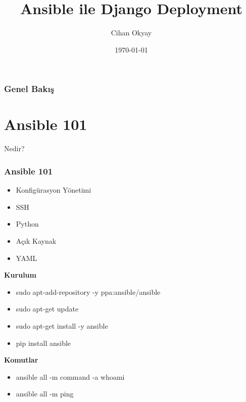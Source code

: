 \documentclass{beamer}
\title[Ansible]{Ansible ile Django Deployment} %
\author{Cihan Okyay} %
\institute[pyistanbul] %
{
Python Istanbul \\ %
\medskip
\textit{@cihann, okyaycihan@gmail.com} %
}
\date{\today} %
\begin{document}
\begin{frame}
\titlepage %
\end{frame}

\begin{frame}
\frametitle{Genel Bakış} %
\tableofcontents %
\end{frame}


\section{Ansible 101} %
\begin{frame}
{Nedir?}
\frametitle{Ansible 101}
\begin{itemize}
\item Konfigürasyon Yönetimi
\item SSH
\item Python
\item Açık Kaynak
\item YAML
\end{itemize}

\end{frame}

\begin{frame}
\textbf{Kurulum}
\begin{itemize}
\item sudo apt-add-repository -y ppa:ansible/ansible
\item sudo apt-get update
\item sudo apt-get install -y ansible
\vspace{.25in}
\item pip install ansible
\end{itemize}

\vspace{0.25in}

\textbf{Komutlar}
\begin{itemize}
\item ansible all -m command -a whoami
\item ansible all -m ping
\end{itemize}
\end{frame}
\end{document}
